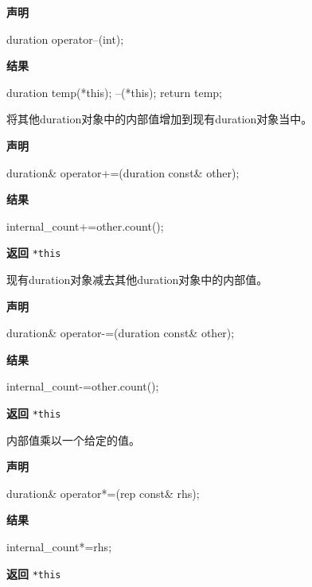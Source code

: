 \textbf{声明}

\begin{cpp}
duration operator--(int);
\end{cpp}

\textbf{结果}

\begin{cpp}
duration temp(*this);
--(*this);
return temp;
\end{cpp}


将其他duration对象中的内部值增加到现有duration对象当中。

\textbf{声明}

\begin{cpp}
duration& operator+=(duration const& other);
\end{cpp}

\textbf{结果}

\begin{cpp}
internal_count+=other.count();
\end{cpp}

\textbf{返回}
\texttt{*this}


现有duration对象减去其他duration对象中的内部值。

\textbf{声明}

\begin{cpp}
duration& operator-=(duration const& other);
\end{cpp}

\textbf{结果}

\begin{cpp}
internal_count-=other.count();
\end{cpp}

\textbf{返回}
\texttt{*this}


内部值乘以一个给定的值。

\textbf{声明}

\begin{cpp}
duration& operator*=(rep const& rhs);
\end{cpp}

\textbf{结果}

\begin{cpp}
internal_count*=rhs;
\end{cpp}

\textbf{返回}
\texttt{*this}

